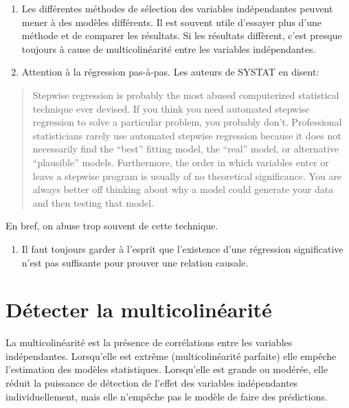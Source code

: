 \documentclass[12pt,]{book}
\providecommand{\tightlist}{%
  \setlength{\itemsep}{0pt}\setlength{\parskip}{0pt}}
\begin{document}
\begin{enumerate}
\def\labelenumi{\arabic{enumi}.}
\tightlist
\item
  Les différentes méthodes de sélection des variables indépendantes peuvent mener à des modèles différents. Il est souvent utile d'essayer plus d'une méthode et de comparer les résultats. Si les résultats diffèrent, c'est presque toujours à cause de multicolinéarité entre les variables indépendantes.
\item
  Attention à la régression pas-à-pas. Les auteurs de SYSTAT en disent:
\end{enumerate}

\begin{quote}
Stepwise regression is probably the most abused computerized statistical technique ever devised. If you think you need automated stepwise regression to solve a particular problem, you probably don't. Professional statisticians rarely use automated stepwise regression because it does not necessarily find the ``best'' fitting model, the ``real'' model, or alternative ``plausible'' models. Furthermore, the order in which variables enter or leave a stepwise program is usually of no theoretical significance. You are always better off thinking about why a model could generate your data and then testing that model.
\end{quote}

En bref, on abuse trop souvent de cette technique.

\begin{enumerate}
\def\labelenumi{\arabic{enumi}.}
\setcounter{enumi}{2}
\tightlist
\item
  Il faut toujours garder à l'esprit que l'existence d'une régression significative n'est pas suffisante pour prouver une relation causale.
\end{enumerate}

\hypertarget{duxe9tecter-la-multicolinuxe9arituxe9}{%
\section{Détecter la multicolinéarité}\label{duxe9tecter-la-multicolinuxe9arituxe9}}

La multicolinéarité est la présence de corrélations entre les variables indépendantes. Lorsqu'elle est extrême (multicolinéarité parfaite) elle empêche l'estimation des modèles statistiques. Lorsqu'elle est grande ou modérée, elle réduit la puissance de détection de l'effet des variables indépendantes individuellement, mais elle n'empêche pas le modèle de faire des prédictions.
\end{document}
